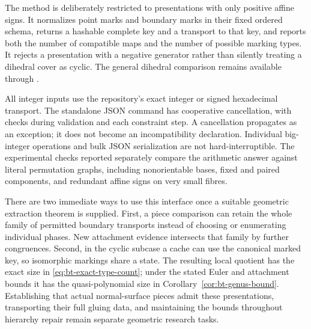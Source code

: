 The  method is deliberately restricted to
presentations with only positive affine signs.  It normalizes point
marks and boundary marks in their fixed ordered schema, returns a
hashable complete key and a transport to that key, and reports both the
number of compatible maps and the number of possible marking types.
It rejects a presentation with a negative generator rather than silently
treating a dihedral cover as cyclic.  The general dihedral comparison
remains available through .

All integer inputs use the repository's exact integer or signed
hexadecimal transport.  The standalone JSON command has cooperative
cancellation, with checks during validation and each constraint step.
A cancellation propagates as an exception; it does not become an
incompatibility declaration.  Individual big-integer operations and
bulk JSON serialization are not hard-interruptible.  The experimental
checks reported separately compare the arithmetic answer against
literal permutation graphs, including nonorientable bases, fixed and
paired components, and redundant affine signs on very small fibres.

There are two immediate ways to use this interface once a suitable
geometric extraction theorem is supplied.  First, a piece comparison can
retain the whole family of permitted boundary transports instead of
choosing or enumerating individual phases.  New attachment evidence
intersects that family by further congruences.  Second, in the cyclic
subcase a cache can use the canonical marked key, so isomorphic markings
share a state.  The resulting local quotient has the exact size in
\eqref{eq:bt-exact-type-count}; under the stated Euler and attachment
bounds it has the quasi-polynomial size in
Corollary~\ref{cor:bt-genus-bound}.  Establishing that actual normal-surface
pieces admit these presentations, transporting their full gluing data,
and maintaining the bounds throughout hierarchy repair remain separate
geometric research tasks.
